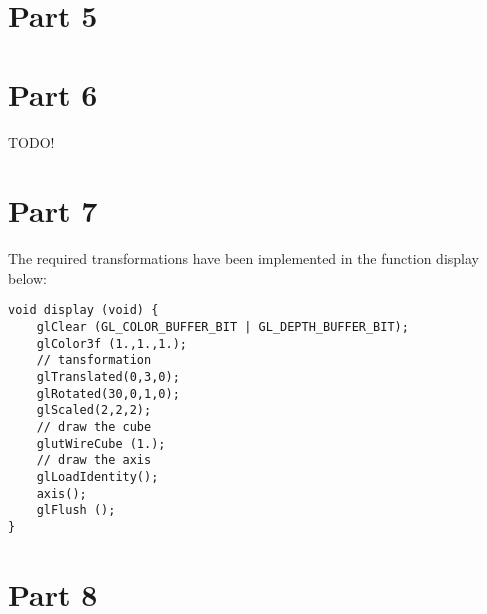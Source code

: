 




\section{Part 5}


\section{Part 6}

TODO!

\section{Part 7}
The required transformations have been implemented in the function display below:
\begin{lstlisting}[caption=Snapshot from Part7.cpp]
void display (void) {
    glClear (GL_COLOR_BUFFER_BIT | GL_DEPTH_BUFFER_BIT);
    glColor3f (1.,1.,1.);
    // tansformation
    glTranslated(0,3,0);
    glRotated(30,0,1,0);
    glScaled(2,2,2);
    // draw the cube
    glutWireCube (1.);
    // draw the axis 
    glLoadIdentity();
    axis();
    glFlush ();
}
\end{lstlisting}


\section{Part 8}


